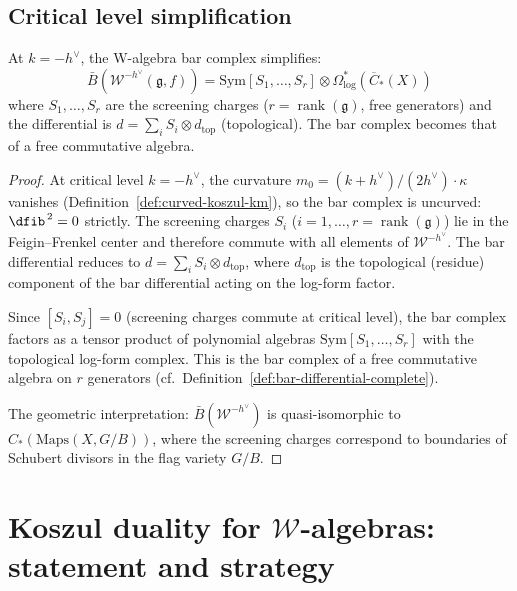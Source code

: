 \subsection{Critical level simplification}

\begin{theorem}\label{thm:w-critical-bar}
At $k = -h^\vee$, the W-algebra bar complex simplifies:
\begin{equation}
\bar{B}(\mathcal{W}^{-h^\vee}(\mathfrak{g}, f)) = \text{Sym}[S_1, \ldots, S_r] \otimes \Omega^*_{\log}(\overline{C}_*(X))
\end{equation}
where $S_1, \ldots, S_r$ are the screening charges ($r = \operatorname{rank}(\mathfrak{g})$, free generators) and the differential is $d = \sum_i S_i \otimes d_{\text{top}}$ (topological).  The bar complex becomes that of a free commutative algebra.
\end{theorem}

\begin{proof}
At critical level $k = -h^\vee$, the curvature
$m_0 = (k + h^\vee)/(2h^\vee) \cdot \kappa$ vanishes
(Definition~\ref{def:curved-koszul-km}), so the bar complex is
uncurved: $\dfib^{\,2} = 0$ strictly.  The screening charges
$S_i$ ($i = 1, \ldots, r = \operatorname{rank}(\mathfrak{g})$)
lie in the Feigin--Frenkel center \cite{FF} and therefore commute
with all elements of $\mathcal{W}^{-h^\vee}$.  The bar differential
reduces to $d = \sum_i S_i \otimes d_{\mathrm{top}}$, where
$d_{\mathrm{top}}$ is the topological (residue) component of the
bar differential acting on the log-form factor.

Since $[S_i, S_j] = 0$ (screening charges commute at critical level),
the bar complex factors as a tensor product of polynomial algebras
$\mathrm{Sym}[S_1, \ldots, S_r]$ with the topological log-form
complex.  This is the bar complex of a free commutative
algebra on $r$ generators
(cf.\ Definition~\ref{def:bar-differential-complete}).

The geometric interpretation: $\bar{B}(\mathcal{W}^{-h^\vee})$
is quasi-isomorphic to $C_*(\mathrm{Maps}(X, G/B))$, where the
screening charges correspond to boundaries of Schubert divisors in the
flag variety $G/B$.
\end{proof}

\section{Koszul duality for $\mathcal{W}$-algebras: statement and strategy}

